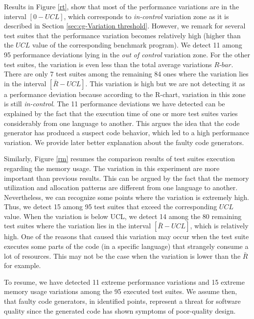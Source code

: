 Results in Figure \ref{rt}, show that most of the performance variations are in the interval $[0-UCL]$, which corresponds to \textit{in-control} variation zone as it is described in Section \ref{sec:cg-Variation threshold}. However, we remark for several test suites that the performance variation becomes relatively high (higher than the $UCL$ value of the corresponding benchmark program). We detect 11 among 95 performance deviations lying in the \textit{out of control} variation zone. For the other test suites, the variation is even less than the total average variations $R$-$bar$. There are only 7 test suites among the remaining 84 ones where the variation lies in the interval $[\bar{R}-UCL]$. This variation is high but we are not detecting it as a performance deviation because according to the R-chart, variation in this zone is still \textit{in-control}. 
The 11 performance deviations we have detected can be explained by the fact that the execution time of one or more test suites varies considerably from one language to another. This argues the idea that the code generator has produced a suspect code behavior, which led to a high performance variation. We provide later better explanation about the faulty code generators.

Similarly, Figure \ref{rm} resumes the comparison results of test suites execution regarding the memory usage. The variation in this experiment are more important than previous results. This can be argued by the fact that the memory utilization and allocation patterns are different from one language to another. Nevertheless, we can recognize some points where the variation is extremely high. Thus, we detect 15 among 95 test suites that exceed the corresponding $UCL$ value. 
When the variation is below UCL, we detect 14 among the 80 remaining test suites where the variation lies in the interval $[\bar{R}-UCL]$, which is relatively high. 
One of the reasons that caused this variation may occur when the test suite executes some parts of the code (in a specific language) that strangely consume a lot of resources. This may not be the case when the variation is lower than the $\bar{R}$ for example.


To resume, we have detected 11 extreme performance variations and 15 extreme memory usage variations among the 95 executed test suites. We assume then, that faulty code generators, in identified points, represent a threat for software quality since the generated code has shown symptoms of poor-quality design. 



